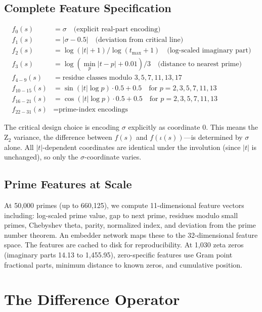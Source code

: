 \documentclass[11pt,a4paper]{article}
\begin{document}
\subsection{Complete Feature Specification}

\begin{align*}
f_0(s) &= \sigma \quad \text{(explicit real-part encoding)} \\
f_1(s) &= |\sigma - 0.5| \quad \text{(deviation from critical line)} \\
f_2(s) &= \log(|t|+1) / \log(t_{\max}+1) \quad \text{(log-scaled imaginary part)} \\
f_3(s) &= \log(\min_p |t-p| + 0.01) / 3 \quad \text{(distance to nearest prime)} \\
f_{4-9}(s) &= \text{residue classes modulo } 3,5,7,11,13,17 \\
f_{10-15}(s) &= \sin(|t| \log p) \cdot 0.5 + 0.5 \quad \text{for } p = 2,3,5,7,11,13 \\
f_{16-21}(s) &= \cos(|t| \log p) \cdot 0.5 + 0.5 \quad \text{for } p = 2,3,5,7,11,13 \\
f_{22-31}(s) &= \text{prime-index encodings}
\end{align*}

The critical design choice is encoding $\sigma$ explicitly as coordinate 0. This means the Z$_2$ variance, the difference between $f(s)$ and $f(\iota(s))$---is determined by $\sigma$ alone. All $|t|$-dependent coordinates are identical under the involution (since $|t|$ is unchanged), so only the $\sigma$-coordinate varies.

\subsection{Prime Features at Scale}

At 50,000 primes (up to 660,125), we compute 11-dimensional feature vectors including: log-scaled prime value, gap to next prime, residues modulo small primes, Chebyshev theta, parity, normalized index, and deviation from the prime number theorem. An embedder network maps these to the 32-dimensional feature space. The features are cached to disk for reproducibility. At 1,030 zeta zeros (imaginary parts 14.13 to 1,455.95), zero-specific features use Gram point fractional parts, minimum distance to known zeros, and cumulative position.

\section{The Difference Operator}
\end{document}
